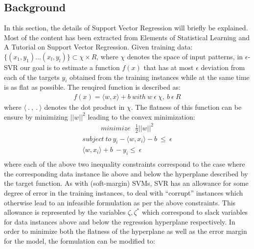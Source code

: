 \documentclass[12pt]{article}
\begin{document}
\subsection{Background}
\label{Background} 
In this section, the details of Support Vector Regression will briefly be explained. Most of the content has been extracted from Elements of Statistical Learning and A Tutorial on Support Vector Regression.
\newline\newline
 Given training data: $\{(x_{1}, y_{1})\dots(x_{l}, y_{l})\}\subset \chi \times R$, where $\chi$ denotes the space of input patterns, in $\epsilon$-SVR our goal is to estimate a function $f(x)$ that has at most $\epsilon$ deviation from each of the targets $y_{i}$ obtained from the training instances while at the same time is as flat as possible. The reuqired function is described as:  
 \begin{gather*} 
f(x) = \langle w, x\rangle + b \ with\  w\  \epsilon\ \chi, \ b\ \epsilon\ R
 \end{gather*}
 where $\langle\ .\ ,\ .\ \rangle$ denotes the dot product in $\chi$. The flatness of this function can be ensure by minimizing $||w||^2$ leading to the convex minimization:
\belowdisplayskip=0pt
 \begin{gather*} 
minimize\ \ \ \frac{1}{2}||w||^2
\end{gather*}
\begin{align*}
subject\ to\ y_{i} - \langle w, x_{i}\rangle - b\ \leq\ \epsilon\\ 
\langle w, x_{i}\rangle + b\ - y_{i} \leq\ \epsilon\\
 \end{align*}
where each of the above two inequality constraints correspond to the case where the corresponding data instance lie above and below the hyperplane described by the target function.
\newline\newline
As with (soft-margin) SVMs, SVR has an allowance for some degree of error in the training instances, to deal with ``corrupt''  instances which otherwise lead to an infeasible  formulation as per the above constraints. This allowance is represented by the variables $\zeta, \zeta^*$ which correspond to slack variables for data instances above and below the regression hyperplane respectively. 
\newline\newline
 In order to minimize both the flatness of the hyperplane as well as the error margin for the model, the formulation can be modified to:
\end{document}
